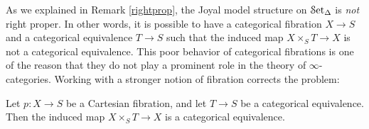 As we explained in Remark \ref{rightprop}, the Joyal model structure on $\operatorname{\mathcal{S}et_{\Delta}}$ is {\em not} right proper. In other words, it is possible to have a categorical fibration $X \rightarrow S$ and 
a categorical equivalence $T \rightarrow S$ such that the induced map $X \times_{S} T \rightarrow X$ is not a categorical equivalence. This poor behavior of categorical fibrations is one of the reason that they do not play a prominent role in the theory of $\infty$-categories. Working with a stronger notion of fibration corrects the problem:

\begin{proposition}\label{basechangefunky}
Let $p: X \rightarrow S$ be a Cartesian fibration, and let $T \rightarrow S$ be a categorical equivalence. Then the induced map $X \times_{S} T \rightarrow X$ is a categorical equivalence.
\end{proposition}

